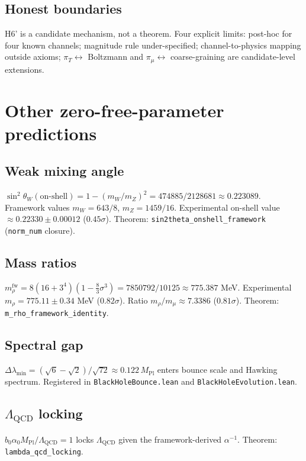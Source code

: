 \documentclass[11pt,twoside]{article}
\begin{document}
\subsection{Honest boundaries}
H6' is a candidate mechanism, not a theorem. Four explicit limits: post-hoc for four known channels; magnitude rule under-specified; channel-to-physics mapping outside axioms; $\pi_T \leftrightarrow$ Boltzmann and $\pi_\mu \leftrightarrow$ coarse-graining are candidate-level extensions.

\section{Other zero-free-parameter predictions}
\label{sec:other}

\subsection{Weak mixing angle}
$\sin^2\theta_W(\text{on-shell}) = 1 - (m_W/m_Z)^2 = 474885/2128681 \approx 0.223089$. Framework values $m_W = 643/8$, $m_Z = 1459/16$. Experimental on-shell value $\approx 0.22330 \pm 0.00012$ ($0.45\sigma$). Theorem: \texttt{sin2theta\_onshell\_framework} (\texttt{norm\_num} closure).

\subsection{Mass ratios}
$m_\rho^{\mathrm{fw}} = 8(16+3^4)(1 - \frac{8}{3}\sigma^3) = 7850792/10125 \approx 775.387$ MeV. Experimental $m_\rho = 775.11 \pm 0.34$ MeV ($0.82\sigma$). Ratio $m_\rho/m_\mu \approx 7.3386$ ($0.81\sigma$). Theorem: \texttt{m\_rho\_framework\_identity}.

\subsection{Spectral gap}
$\Delta\lambda_{\min} = (\sqrt{6}-\sqrt{2})/\sqrt{72} \approx 0.122\,M_{\mathrm{Pl}}$ enters bounce scale and Hawking spectrum. Registered in \texttt{BlackHoleBounce.lean} and \texttt{BlackHoleEvolution.lean}.

\subsection{$\Lambda_{\mathrm{QCD}}$ locking}
$b_0\alpha_0 M_{\mathrm{Pl}}/\Lambda_{\mathrm{QCD}} = 1$ locks $\Lambda_{\mathrm{QCD}}$ given the framework-derived $\alpha^{-1}$. Theorem: \texttt{lambda\_qcd\_locking}.
\end{document}
